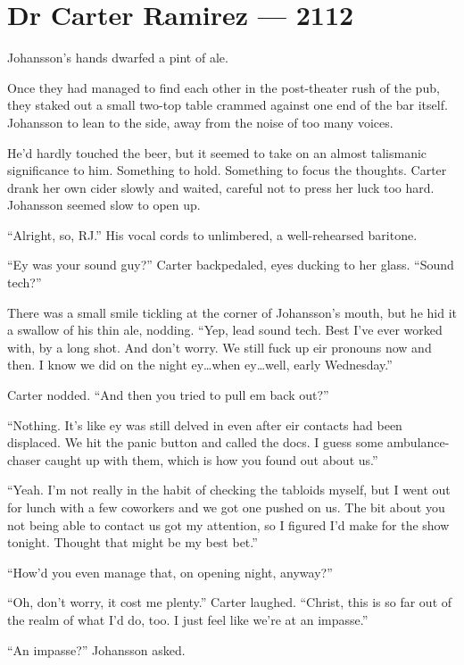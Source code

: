 \hypertarget{dr-carter-ramirez-2112}{%
\chapter*{Dr Carter Ramirez — 2112}\label{dr-carter-ramirez-2112}}

Johansson's hands dwarfed a pint of ale.

Once they had managed to find each other in the post-theater rush of the pub, they staked out a small two-top table crammed against one end of the bar itself. Johansson to lean to the side, away from the noise of too many voices.

He'd hardly touched the beer, but it seemed to take on an almost talismanic significance to him. Something to hold. Something to focus the thoughts. Carter drank her own cider slowly and waited, careful not to press her luck too hard. Johansson seemed slow to open up.

``Alright, so, RJ.'' His vocal cords to unlimbered, a well-rehearsed baritone.

``Ey was your sound guy?'' Carter backpedaled, eyes ducking to her glass. ``Sound tech?''

There was a small smile tickling at the corner of Johansson's mouth, but he hid it a swallow of his thin ale, nodding. ``Yep, lead sound tech. Best I've ever worked with, by a long shot. And don't worry. We still fuck up eir pronouns now and then. I know we did on the night ey\ldots{}when ey\ldots{}well, early Wednesday.''

Carter nodded. ``And then you tried to pull em back out?''

``Nothing. It's like ey was still delved in even after eir contacts had been displaced. We hit the panic button and called the docs. I guess some ambulance-chaser caught up with them, which is how you found out about us.''

``Yeah. I'm not really in the habit of checking the tabloids myself, but I went out for lunch with a few coworkers and we got one pushed on us. The bit about you not being able to contact us got my attention, so I figured I'd make for the show tonight. Thought that might be my best bet.''

``How'd you even manage that, on opening night, anyway?''

``Oh, don't worry, it cost me plenty.'' Carter laughed. ``Christ, this is so far out of the realm of what I'd do, too. I just feel like we're at an impasse.''

``An impasse?'' Johansson asked.

